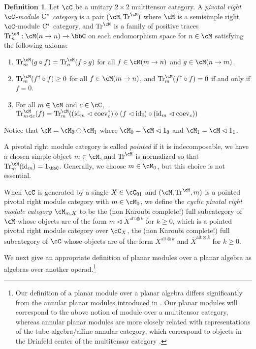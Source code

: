\documentclass[11pt]{article}
\theoremstyle{plain}
\theoremstyle{definition}
\newtheorem{defn}[thm]{Definition}
\DeclareMathOperator{\coev}{coev}
\DeclareMathOperator{\id}{id}
\DeclareMathOperator{\Tr}{Tr}
\newcommand{\Cstar}{\rm{C^*}}
\begin{document}
\begin{defn}
 \label{def:PivotalModule}
Let $\cC$ be a unitary $2\times 2$ multitensor category.
A \emph{pivotal right $\cC$-module $\Cstar$ category} is a pair $(\cM,\Tr^\cM)$ where
$\cM$ is a semisimple right $\cC$-module $\Cstar$ category, and $\Tr^\cM$ is a family of positive traces $\Tr^\cM_n:\cM(n \to n)\to \bbC$ on each endomorphism space for $n\in \cM$ satisfying the following axioms:
\begin{enumerate}[label={\rm(Tr\arabic*)}]
\item
\label{PivotalModule:tracial}
$\Tr^\cM_m(g \circ f) = \Tr^\cM_n(f\circ g)$ for all $f\in \cM(m\to n)$ and $g\in \cM(n \to m)$.
\item
\label{PivotalModule:positive}
$\Tr^\cM_m(f^\dag \circ f) \geq 0$ for all $f\in \cM(m \to n)$, and $\Tr^\cM_m(f^\dag \circ f) =0$ if and only if $f = 0$.
\item
\label{PivotalModule:compatible}
For all $m\in \cM$ and $c\in \cC$,
$
\Tr^\cM_{m\vartriangleleft c}(f)
=
\Tr^\cM_{m}(
(\id_m \vartriangleleft \coev_c^\dag) \circ (f\vartriangleleft \id_{\overline{c}}) \circ (\id_m \vartriangleleft \coev_c)
)
$
\end{enumerate}
Notice that $\cM = \cM_0 \oplus \cM_1$ where $\cM_0 = \cM \vartriangleleft 1_0$ and $\cM_1 = \cM\vartriangleleft 1_1$.

A pivotal right module category is called \emph{pointed} if it is indecomposable, we have a chosen simple object $m\in \cM$, and $\Tr^\cM$ is normalized so that $\Tr^\cM_m(\id_m) = 1_\bbC$.
Generally, we choose $m\in \cM_0$, but this choice is not essential.

When $\cC$ is generated by a single $X\in \cC_{01}$ and $(\cM,\Tr^\cM,m)$ is a pointed pivotal right module category with $m\in \cM_0$, we define the \emph{cyclic pivotal right module category} $\cM_{m,X}$ to be the (non Karoubi complete!) full subcategory of $\cM$ whose objects are of the form 
$
m \vartriangleleft X^{ \text{alt}\otimes k}
$ 
for $k\geq 0$, which is a pointed pivotal right module category over $\cC_X$, the (non Karoubi complete!) full subcategory of $\cC$ whose objects are of the form $X^{ \text{alt}\otimes k}$ and $\overline{X}^{ \text{alt}\otimes k}$ for $k\geq 0$.
\end{defn}


We next give an appropriate definition of planar modules over a planar algebra as algebras over another operad.\footnote{
Our definition of a planar module over a planar algebra differs significantly from the annular planar modules introduced in \cite{MR1929335}. 
Our planar modules will correspond to the above notion of module over a multitensor category, 
whereas annular planar modules 
are more closely related with representations of the tube algebra/affine annular category, which correspond to objects in the Drinfeld center of the multitensor category \cite{MR3447719}.
}
\end{document}
